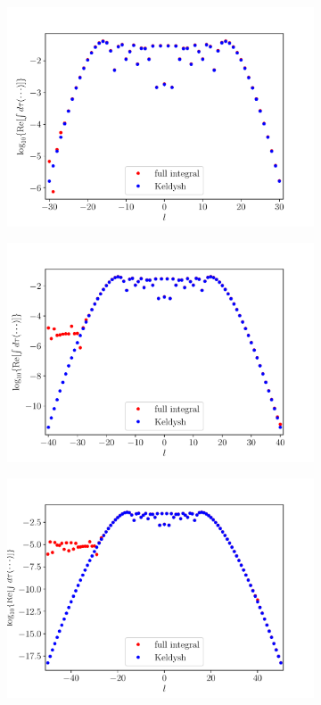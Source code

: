\begin{figure}
  \begin{subfigure}[b]{0.33\linewidth}
    \includegraphics[width=\textwidth]{figures/ch_ATI_SFA/1b1/l30n512WP20PG15MR35vsKeldysh.pdf}
  \end{subfigure}
  \begin{subfigure}[b]{0.33\linewidth}
    \includegraphics[width=\textwidth]{figures/ch_ATI_SFA/1b1/l40n512WP20PG15MR35vsKeldysh.pdf}
  \end{subfigure}
  \begin{subfigure}[b]{0.33\linewidth}
    \includegraphics[width=\textwidth]{figures/ch_ATI_SFA/1b1/l50n512WP40PG25MR35vsKeldysh.pdf}

\end{subfigure}
\end{figure}
